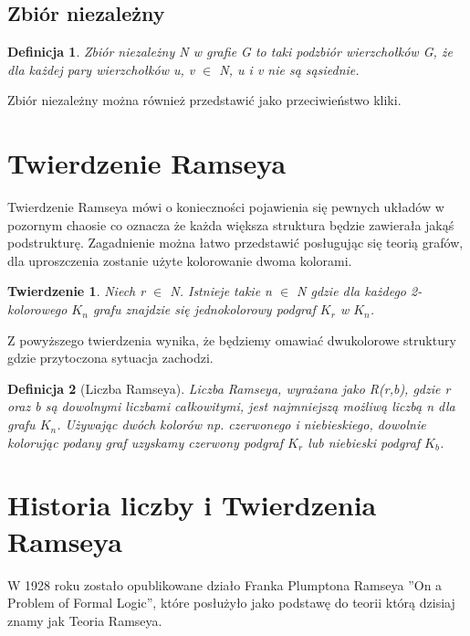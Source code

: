 \documentclass[11pt]{article}
\newtheorem{theorem}{Twierdzenie}
\newtheorem{definition}{Definicja}[section]
\begin{document}
  \subsection{Zbiór niezależny}
  \begin{definition}
    Zbiór niezależny N w grafie G to taki podzbiór wierzchołków G, że dla każdej pary wierzchołków u, v $\in$ N, u i v nie są sąsiednie. 
  \end{definition}
  
    Zbiór niezależny można również przedstawić jako przeciwieństwo kliki.
   

\section{Twierdzenie Ramseya}

Twierdzenie Ramseya mówi o konieczności pojawienia się pewnych układów w pozornym chaosie co oznacza że każda większa struktura będzie zawierała jakąś podstrukturę. Zagadnienie można łatwo przedstawić posługując się teorią grafów, dla uproszczenia zostanie użyte kolorowanie dwoma kolorami.

\begin{theorem}
Niech r $\in$ N. Istnieje takie n $\in$ N gdzie dla każdego 2-kolorowego $\mathit{K}_{n}$ grafu znajdzie się jednokolorowy podgraf $\mathit{K}_{r}$ w $\mathit{K}_{n}$.
\end{theorem}

Z powyższego twierdzenia wynika, że będziemy omawiać dwukolorowe struktury gdzie przytoczona sytuacja zachodzi. 

\begin{definition}[Liczba Ramseya]
Liczba Ramseya, wyrażana jako R(r,b), gdzie r oraz b są dowolnymi liczbami całkowitymi, jest najmniejszą możliwą liczbą n dla grafu $\mathit{K}_{n}$. Używając dwóch kolorów np. czerwonego i niebieskiego, dowolnie kolorując podany graf uzyskamy czerwony podgraf $\mathit{K}_{r}$ lub niebieski podgraf $\mathit{K}_{b}$.
\end{definition}




\section{Historia liczby i Twierdzenia Ramseya}

W 1928 roku zostało opublikowane działo Franka Plumptona Ramseya ''On a Problem of Formal Logic'', które posłużyło jako podstawę do teorii którą dzisiaj znamy jak Teoria Ramseya. 
\end{document}
